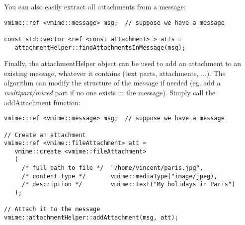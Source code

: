 You can also easily extract all attachments from a message:

\begin{lstlisting}[caption={Extracting all attachments from a message}]
vmime::ref <vmime::message> msg;  // suppose we have a message

const std::vector <ref <const attachment> > atts =
   attachmentHelper::findAttachmentsInMessage(msg);
\end{lstlisting}

Finally, the {\vcode attachmentHelper} object can be used to add an
attachment to an existing message, whatever it contains (text parts,
attachments, ...). The algorithm can modify the structure of the
message if needed (eg. add a \emph{multipart/mixed} part if no one
exists in the message). Simply call the {\vcode addAttachment}
function:

\begin{lstlisting}[caption={Adding an attachment to an existing message}]
vmime::ref <vmime::message> msg;  // suppose we have a message

// Create an attachment
vmime::ref <vmime::fileAttachment> att =
   vmime::create <vmime::fileAttachment>
   (
     /* full path to file */  "/home/vincent/paris.jpg",
     /* content type */       vmime::mediaType("image/jpeg),
     /* description */        vmime::text("My holidays in Paris")
   );

// Attach it to the message
vmime::attachmentHelper::addAttachment(msg, att);
\end{lstlisting}

